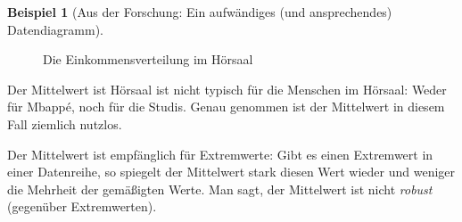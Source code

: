 \documentclass[
  a4paper,
]{scrbook}
\theoremstyle{definition}
\newtheorem{example}{Beispiel}[chapter]
\theoremstyle{definition}
\theoremstyle{definition}
\theoremstyle{remark}
\begin{document}
\begin{example}[Aus der Forschung: Ein aufwändiges (und ansprechendes)
Datendiagramm]
\begin{figure}
\begin{minipage}{\linewidth}
{}


\end{minipage}%
\newline
\begin{minipage}{\linewidth}



\end{minipage}%

\caption{\label{fig-mbappe}Die Einkommensverteilung im Hörsaal}

\end{figure}%

Der Mittelwert ist Hörsaal ist nicht typisch für die Menschen im
Hörsaal: Weder für Mbappé, noch für die Studis. Genau genommen ist der
Mittelwert in diesem Fall ziemlich nutzlos.

\begin{tcolorbox}[enhanced jigsaw, colbacktitle=quarto-callout-important-color!10!white, bottomrule=.15mm, left=2mm, breakable, rightrule=.15mm, coltitle=black, title=\textcolor{quarto-callout-important-color}{\faExclamation}\hspace{0.5em}{Wichtig}, colback=white, leftrule=.75mm, titlerule=0mm, opacityback=0, bottomtitle=1mm, toprule=.15mm, arc=.35mm, toptitle=1mm, opacitybacktitle=0.6, colframe=quarto-callout-important-color-frame]

Der Mittelwert ist empfänglich für Extremwerte: Gibt es einen Extremwert
in einer Datenreihe, so spiegelt der Mittelwert stark diesen Wert wieder
und weniger die Mehrheit der gemäßigten Werte. Man sagt, der Mittelwert
ist nicht \emph{robust} (gegenüber Extremwerten).


\end{tcolorbox}
\end{example}
\end{document}
